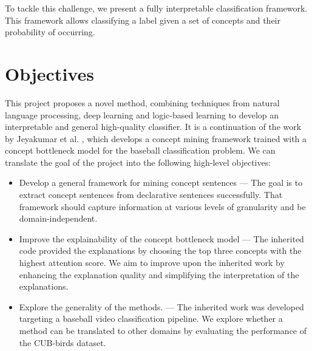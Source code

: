 To tackle this challenge, we present a fully interpretable classification framework.
This framework allows classifying a label given a set of concepts and their probability of occurring.


\section{Objectives}

This project proposes a novel method, combining techniques from natural language processing, deep learning and logic-based learning to develop an interpretable and general high-quality classifier.
It is a continuation of the work by Jeyakumar et al. \cite{RefWorks:RefID:16-2021automatic}, which develops a concept mining framework trained with a concept bottleneck model for the baseball classification problem. 
We can translate the goal of the project into the following high-level objectives:


\begin{itemize}
    \item Develop a general framework for mining concept sentences --- The goal is to extract concept sentences from declarative sentences successfully. That framework should capture information at various levels of granularity and be domain-independent.
    
    \item Improve the explainability of the concept bottleneck model ---  The inherited code provided the explanations by choosing the top three concepts with the highest attention score.
    We aim to improve upon the inherited work by enhancing the explanation quality and simplifying the interpretation of the explanations.
    
    \item Explore the generality of the methods. --- The inherited work was developed targeting a baseball video classification pipeline.
    We explore whether a method can be translated to other domains by evaluating the performance of the CUB-birds dataset.
    
\end{itemize}

